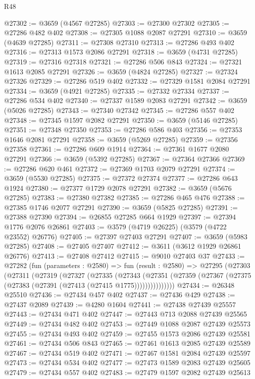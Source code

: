 \begin{lexlean}{R48}
\begin{coremodule}
@27302 := @3659 (@4567 @27285)
@27303 := @27300 @27302
@27305 := @27286 @482 @402
@27308 := @27305 @1088 @2087 @27291
@27310 := @3659 (@4639 @27285)
@27311 := @27308 @27310
@27313 := @27286 @493 @402
@27316 := @27313 @1573 @2086 @27291
@27318 := @3659 (@4731 @27285)
@27319 := @27316 @27318
@27321 := @27286 @506 @843
@27324 := @27321 @1613 @2085 @27291
@27326 := @3659 (@4824 @27285)
@27327 := @27324 @27326
@27329 := @27286 @519 @402
@27332 := @27329 @1581 @2084 @27291
@27334 := @3659 (@4921 @27285)
@27335 := @27332 @27334
@27337 := @27286 @534 @402
@27340 := @27337 @1589 @2083 @27291
@27342 := @3659 (@5026 @27285)
@27343 := @27340 @27342
@27345 := @27286 @557 @402
@27348 := @27345 @1597 @2082 @27291
@27350 := @3659 (@5146 @27285)
@27351 := @27348 @27350
@27353 := @27286 @586 @403
@27356 := @27353 @1646 @2081 @27291
@27358 := @3659 (@5269 @27285)
@27359 := @27356 @27358
@27361 := @27286 @609 @1914
@27364 := @27361 @1677 @2080 @27291
@27366 := @3659 (@5392 @27285)
@27367 := @27364 @27366
@27369 := @27286 @620 @461
@27372 := @27369 @1703 @2079 @27291
@27374 := @3659 (@5530 @27285)
@27375 := @27372 @27374
@27377 := @27286 @643 @1924
@27380 := @27377 @1729 @2078 @27291
@27382 := @3659 (@5676 @27285)
@27383 := @27380 @27382
@27385 := @27286 @465 @476
@27388 := @27385 @1746 @2077 @27291
@27390 := @3659 (@5825 @27285)
@27391 := @27388 @27390
@27394 := @26855 @27285 @664 @1929
@27397 := @27394 @1776 @2076 @26861
@27403 := @3579 (@4719 @26225) (@3579 (@4722 @23552) @26776)
@27405 := @27397 @27403 @27291
@27407 := @3659 (@5983 @27285)
@27408 := @27405 @27407
@27412 := @3611 (@3612 @1929 @26861 @26776)
@27413 := @27408 @27412
@27415 := @9010 @27403 @37
@27433 := @27282
    (fun (parameters : @2580) =>
    fun (result : @2580) =>
    @27295
      (@27303
        (@27311
          (@27319
            (@27327
              (@27335
                (@27343
                  (@27351
                    (@27359 (@27367 (@27375 (@27383 (@27391 (@27413 (@27415 @1775)))))))))))))))
@27434 := @26348 @25510
@27436 := @27434 @457 @402
@27437 := @27436 @429
@27438 := @27437 @2089
@27439 := @4280 @1604
@27441 := @27438 @27439 @25557
@27443 := @27434 @471 @402
@27447 := @27443 @713 @2088 @27439 @25565
@27449 := @27434 @482 @402
@27453 := @27449 @1088 @2087 @27439 @25573
@27455 := @27434 @493 @402
@27459 := @27455 @1573 @2086 @27439 @25581
@27461 := @27434 @506 @843
@27465 := @27461 @1613 @2085 @27439 @25589
@27467 := @27434 @519 @402
@27471 := @27467 @1581 @2084 @27439 @25597
@27473 := @27434 @534 @402
@27477 := @27473 @1589 @2083 @27439 @25605
@27479 := @27434 @557 @402
@27483 := @27479 @1597 @2082 @27439 @25613

\end{coremodule}
\end{lexlean}
